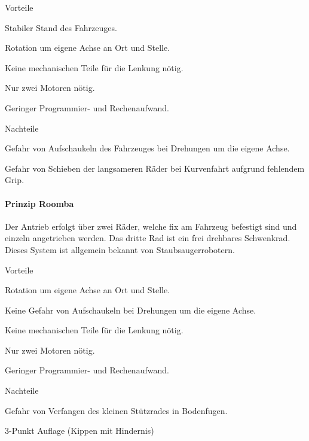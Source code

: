 \documentclass[../main.tex]{subfiles}
\begin{document}
\begin{minipage}[t]{0.48\textwidth}
    \begin{items}
        \item[Vorteile]
        \item Stabiler Stand des Fahrzeuges.
        \item Rotation um eigene Achse an Ort und Stelle.
        \item Keine mechanischen Teile für die Lenkung nötig.
        \item Nur zwei Motoren nötig.
        \item Geringer Programmier- und Rechenaufwand.
    \end{items}
\end{minipage}
\begin{minipage}[t]{0.48\textwidth}
    \begin{items}
      \item [Nachteile]
       \item Gefahr von Aufschaukeln des Fahrzeuges bei Drehungen um die eigene Achse.
      \item Gefahr von Schieben der langsameren Räder bei Kurvenfahrt aufgrund fehlendem Grip.
    \end{items}
\end{minipage}

\paragraph{Prinzip Roomba} \label{recherche-prinzip-roomba}
Der Antrieb erfolgt über zwei Räder, welche fix am Fahrzeug befestigt sind und einzeln angetrieben werden. Das dritte Rad ist ein frei drehbares Schwenkrad. Dieses System ist allgemein bekannt von Staubsaugerrobotern.

\begin{minipage}[t]{0.48\textwidth}
    \begin{items}
        \item[Vorteile]
        \item Rotation um eigene Achse an Ort und Stelle.
        \item Keine Gefahr von Aufschaukeln bei Drehungen um die eigene Achse.
        \item Keine mechanischen Teile für die Lenkung nötig.
        \item Nur zwei Motoren nötig.
         \item Geringer Programmier- und Rechenaufwand.
    \end{items}
\end{minipage}
\begin{minipage}[t]{0.48\textwidth}
    \begin{items}
      \item [Nachteile]
      \item Gefahr von Verfangen des kleinen Stützrades in Bodenfugen.
      \item 3-Punkt Auflage (Kippen mit Hindernis)
    \end{items}
\end{minipage}
\end{document}
